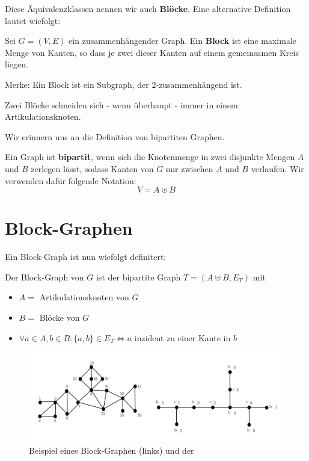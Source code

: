 \documentclass[a4paper]{report}
\begin{document}
Diese Äquivalenzklassen nennen wir auch \textbf{Blöcke}. Eine alternative Definition lautet wiefolgt:

\begin{definition}
    Sei $G = (V,E)$ ein zusammenhängender Graph. Ein \textbf{Block} ist eine maximale Menge von Kanten, so
    dass je zwei dieser Kanten auf einem gemeinsamen Kreis liegen.
\end{definition}
\bigskip

Merke: Ein Block ist ein Subgraph, der 2-zusammenhängend ist.

\begin{lemma}
    Zwei Blöcke schneiden sich - wenn überhaupt - immer in einem Artikulationsknoten.
\end{lemma}
\bigskip

Wir erinnern uns an die Definition von bipartiten Graphen.

\begin{definition}
    Ein Graph ist \textbf{bipartit}, wenn sich die Knotenmenge in zwei disjunkte Mengen
    $A$ und $B$ zerlegen lässt, sodass Kanten von $G$ nur zwischen $A$ und $B$ verlaufen.
    Wir verwenden dafür folgende Notation:
    $$V = A \uplus B$$
\end{definition}
\bigskip


\section{Block-Graphen}
Ein Block-Graph ist nun wiefolgt definitert:

\begin{definition}
    Der Block-Graph von $G$ ist der bipartite Graph $T = (A \uplus B, E_T )$ mit
    \begin{itemize}
        \item $A =$ {Artikulationsknoten von $G$}
        \item $B =$ {Blöcke von $G$}
        \item $\forall a \in A , b \in B: \{a,b\} \in E_T \Leftrightarrow a$ inzident zu einer Kante in $b$
    \end{itemize}
\end{definition}
\bigskip

\begin{figure}[h]
    \centering
    \includegraphics[width=\textwidth]{block_graph.png}
    \caption{Beispiel eines Block-Graphen (links) und der }
\end{figure}
\end{document}
